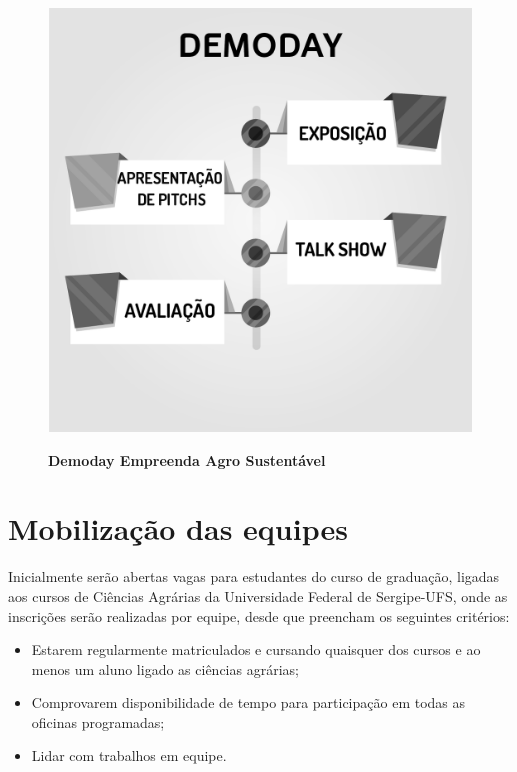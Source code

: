 \begin{figure}[h!]
\centering
\caption{\textbf{Demoday Empreenda Agro Sustentável}}
\includegraphics[scale=0.4]{Imagens/demoday.png}
\label{figura_33}
\end{figure}



\section{Mobilização das equipes}

Inicialmente serão abertas vagas para estudantes do curso de graduação, ligadas aos cursos de Ciências Agrárias da Universidade Federal de Sergipe-UFS, onde as inscrições serão realizadas por equipe, desde que preencham os seguintes critérios:

	
\begin{itemize}
\item{Estarem regularmente matriculados e cursando quaisquer dos cursos e ao menos um aluno ligado as ciências agrárias;}
\item{Comprovarem disponibilidade de tempo para participação em todas as oficinas programadas;}
\item{Lidar com trabalhos em equipe.}
\end{itemize}

